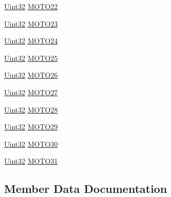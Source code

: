 \begin{DoxyCompactItemize}
\item 
\hyperlink{_d_s_p2833x___device_8h_aba99025e657f892beb7ff31cecf64653}{Uint32} \hyperlink{struct_m_o_t_o___r_e_g_s_a58a2038a941e39f51b9a9e8bffc10ef3}{M\+O\+T\+O22}
\item 
\hyperlink{_d_s_p2833x___device_8h_aba99025e657f892beb7ff31cecf64653}{Uint32} \hyperlink{struct_m_o_t_o___r_e_g_s_a029c68cef2bd9c437dc8820415c9d1aa}{M\+O\+T\+O23}
\item 
\hyperlink{_d_s_p2833x___device_8h_aba99025e657f892beb7ff31cecf64653}{Uint32} \hyperlink{struct_m_o_t_o___r_e_g_s_a772ffda5f191737d564bcf840c7a5877}{M\+O\+T\+O24}
\item 
\hyperlink{_d_s_p2833x___device_8h_aba99025e657f892beb7ff31cecf64653}{Uint32} \hyperlink{struct_m_o_t_o___r_e_g_s_a1a8065bcbd5e9eba9ad5ab6ac1d4c852}{M\+O\+T\+O25}
\item 
\hyperlink{_d_s_p2833x___device_8h_aba99025e657f892beb7ff31cecf64653}{Uint32} \hyperlink{struct_m_o_t_o___r_e_g_s_a1b59e74cdda5bb96a3cb30890a9b3569}{M\+O\+T\+O26}
\item 
\hyperlink{_d_s_p2833x___device_8h_aba99025e657f892beb7ff31cecf64653}{Uint32} \hyperlink{struct_m_o_t_o___r_e_g_s_ab7ce28ef77b62b9e1d545feda0affc5c}{M\+O\+T\+O27}
\item 
\hyperlink{_d_s_p2833x___device_8h_aba99025e657f892beb7ff31cecf64653}{Uint32} \hyperlink{struct_m_o_t_o___r_e_g_s_a2d5b77a8724a37762fb071b0d3349c1f}{M\+O\+T\+O28}
\item 
\hyperlink{_d_s_p2833x___device_8h_aba99025e657f892beb7ff31cecf64653}{Uint32} \hyperlink{struct_m_o_t_o___r_e_g_s_a09ffec565df4b06b32e144d217ee9904}{M\+O\+T\+O29}
\item 
\hyperlink{_d_s_p2833x___device_8h_aba99025e657f892beb7ff31cecf64653}{Uint32} \hyperlink{struct_m_o_t_o___r_e_g_s_af3d792ae4fb2ca59a1a439843d1b137c}{M\+O\+T\+O30}
\item 
\hyperlink{_d_s_p2833x___device_8h_aba99025e657f892beb7ff31cecf64653}{Uint32} \hyperlink{struct_m_o_t_o___r_e_g_s_a0ff69c3cf1dbb6deb608cea6d2892457}{M\+O\+T\+O31}
\end{DoxyCompactItemize}


\subsection{Member Data Documentation}
\hypertarget{struct_m_o_t_o___r_e_g_s_a171855cab3ef5f6f1f6d9ca57ab0349a}{}
